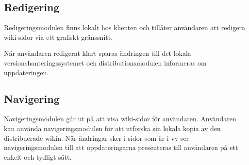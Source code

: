\subsection{Redigering}
Redigeringsmodulen finns lokalt hos klienten och tillåter användaren
att redigera wiki-sidor via ett grafiskt gränssnitt.

När användaren redigerat klart sparas ändringen till det lokala
versionshanteringssystemet och distributionsmodulen informeras om
uppdateringen.
\subsection{Navigering}
Navigeringsmodulen går ut på att visa wiki-sidor för
användaren. Användaren kan använda navigeringsmodulen för att utforska
sin lokala kopia av den distribuerade wikin. När ändringar sker i
sidor som är i vy ser navigeringsmodulen till att uppdateringarna
presenteras till användaren på ett enkelt och tydligt sätt.

